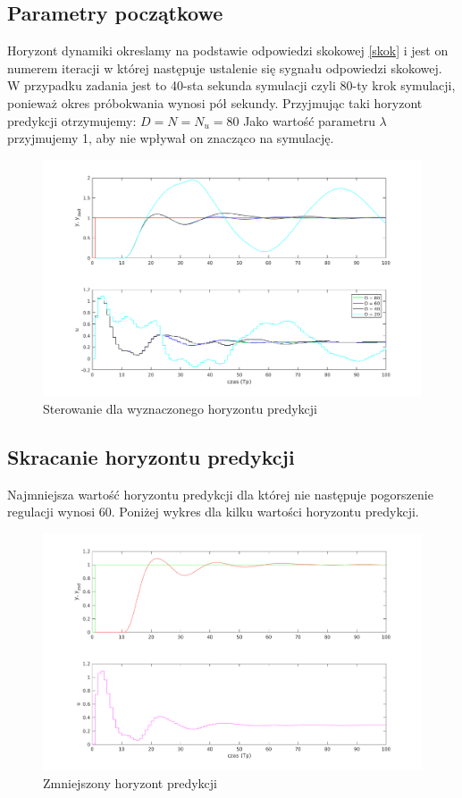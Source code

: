 \documentclass[a4paper, 11pt]{article}
\begin{document}
\subsection{Parametry początkowe}
Horyzont dynamiki okreslamy na podstawie odpowiedzi skokowej \ref{skok} i jest on numerem iteracji w której następuje ustalenie się sygnału odpowiedzi skokowej. W przypadku zadania jest to 40-sta sekunda symulacji czyli 80-ty krok symulacji, ponieważ okres próbokwania wynosi pół sekundy. Przyjmując taki horyzont predykcji otrzymujemy: 
$D = N = N_u = 80$
Jako wartość parametru $\lambda$ przyjmujemy 1, aby nie wpływał on znacząco na symulację. 
\begin{figure}[H]
\centering
\includegraphics[scale=0.60]{horyzont_predykcji_dmc.png}
\caption{Sterowanie dla wyznaczonego horyzontu predykcji}
\label{}
\end{figure}

\subsection{Skracanie horyzontu predykcji}
Najmniejsza wartość horyzontu predykcji dla której nie następuje pogorszenie regulacji wynosi 60. Poniżej wykres dla kilku wartości horyzontu predykcji. 
\begin{figure}[H]
\centering
\includegraphics[scale=0.60]{horyzont_predykcji_skracanie.png}
\caption{Zmniejszony horyzont predykcji}
\label{}
\end{figure}
\end{document}
